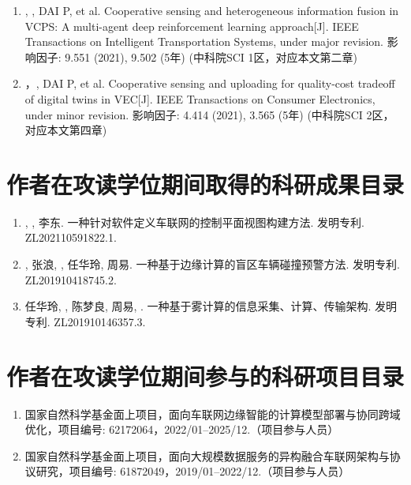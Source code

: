\begin{enumerate}
	\item \textbf{}, , DAI P, et al. Cooperative sensing and heterogeneous information fusion in VCPS: A multi-agent deep reinforcement learning approach[J]. IEEE Transactions on Intelligent Transportation Systems, under major revision. 影响因子: 9.551 (2021), 9.502 (5年) (中科院SCI 1区，对应本文第二章)
	\item {}，\textbf{}, DAI P, et al. Cooperative sensing and uploading for quality-cost tradeoff of digital twins in VEC[J]. IEEE Transactions on Consumer Electronics, under minor revision. 影响因子: 4.414 (2021), 3.565 (5年) (中科院SCI 2区，对应本文第四章) 
\end{enumerate}

\section[\hspace{-2pt}作者在攻读学位期间取得的科研成果目录]{{\heiti{} \hspace{-8pt}作者在攻读学位期间取得的科研成果目录}}
\begin{enumerate}
	\item \textbf{}, , 李东. 一种针对软件定义车联网的控制平面视图构建方法. 发明专利. ZL202110591822.1.
	\item {}, 张浪, \textbf{}, 任华玲, 周易. 一种基于边缘计算的盲区车辆碰撞预警方法. 发明专利. ZL201910418745.2.
	\item 任华玲, , 陈梦良, 周易, \textbf{}. 一种基于雾计算的信息采集、计算、传输架构. 发明专利. ZL201910146357.3.
\end{enumerate}

\section[\hspace{-2pt}作者在攻读学位期间参与的科研项目目录]{{\heiti{} \hspace{-8pt}作者在攻读学位期间参与的科研项目目录}}
\begin{enumerate}
	\item 国家自然科学基金面上项目，面向车联网边缘智能的计算模型部署与协同跨域优化，项目编号: 62172064，2022/01–2025/12.（项目参与人员）
	\item 国家自然科学基金面上项目，面向大规模数据服务的异构融合车联网架构与协议研究，项目编号: 61872049，2019/01–2022/12.（项目参与人员）
\end{enumerate}

